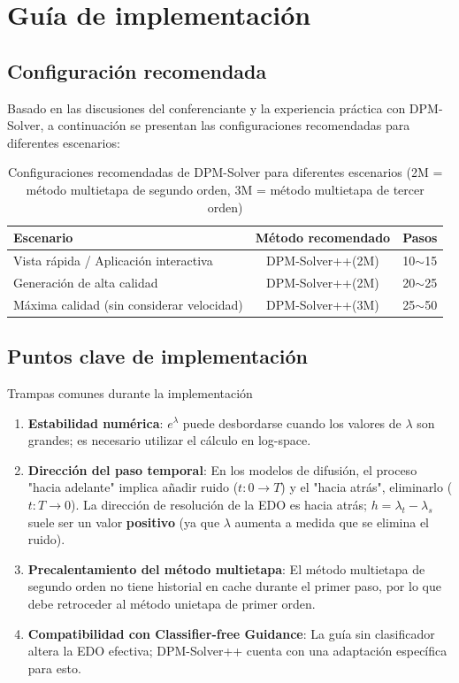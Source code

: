 \section{Guía de implementación}

\subsection{Configuración recomendada}

Basado en las discusiones del conferenciante y la experiencia práctica con DPM-Solver, a continuación se presentan las configuraciones recomendadas para diferentes escenarios:

\begin{table}[H]
\centering
\begin{tabular}{lcc}
\toprule
\textbf{Escenario} & \textbf{Método recomendado} & \textbf{Pasos} \\
\midrule
Vista rápida / Aplicación interactiva & DPM-Solver++(2M) & 10$\sim$15 \\
Generación de alta calidad & DPM-Solver++(2M) & 20$\sim$25 \\
Máxima calidad (sin considerar velocidad) & DPM-Solver++(3M) & 25$\sim$50 \\
\bottomrule
\end{tabular}
\caption{Configuraciones recomendadas de DPM-Solver para diferentes escenarios (2M = método multietapa de segundo orden, 3M = método multietapa de tercer orden)}
\end{table}

\subsection{Puntos clave de implementación}

\begin{warningbox}{Trampas comunes durante la implementación}
\begin{enumerate}
    \item \textbf{Estabilidad numérica}: $e^{\lambda}$ puede desbordarse cuando los valores de $\lambda$ son grandes; es necesario utilizar el cálculo en log-space.
    \item \textbf{Dirección del paso temporal}: En los modelos de difusión, el proceso "hacia adelante" implica añadir ruido ($t: 0 \to T$) y el "hacia atrás", eliminarlo ($t: T \to 0$). La dirección de resolución de la EDO es hacia atrás; $h = \lambda_t - \lambda_s$ suele ser un valor\textbf{ positivo} (ya que $\lambda$ aumenta a medida que se elimina el ruido).
    \item \textbf{Precalentamiento del método multietapa}: El método multietapa de segundo orden no tiene historial en cache durante el primer paso, por lo que debe retroceder al método unietapa de primer orden.
    \item \textbf{Compatibilidad con Classifier-free Guidance}: La guía sin clasificador altera la EDO efectiva; DPM-Solver++ cuenta con una adaptación específica para esto.
\end{enumerate}
\end{warningbox}

